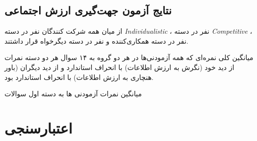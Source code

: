 \subsection{نتایج آزمون جهت‌گیری ارزش اجتماعی}
از میان همه شرکت کنندگان 
\noOfIndividualisticParticipants
نفر در دسته
\textit{
    \gls{Individualistic}
}
،
\noOfCompetitiveParticipants
نفر در دسته
\textit{
    \gls{Competitive}
}
،
\noOfCooperativeParticipants
نفر در دسته
همکاری‌کننده
و
\noOfAltruisticParticipants
نفر در دسته
دیگر‌خواه
قرار داشتند. 

میانگین کلی نمره‌ای که همه آزمودنی‌ها در هر دو گروه به ۱۴ سوال هر دو دسته 
نمرات از دید خود
\!(نگرش به ارزش اطلاعات)
\meanOfSelfWTPAllTwoParticipantGroupsAllTwoQuestionSection
با انحراف استاندارد
\SDOfSelfWTPAllTwoParticipantGroupsAllTwoQuestionSection
و از دید دیگران
\meanOfOtherWTPAllTwoParticipantGroupsAllTwoQuestionSection
\!(باور هنچاری به ارزش اطلاعات)
با انحراف استاندارد
\SDOfOtherWTPAllTwoParticipantGroupsAllTwoQuestionSection
بود.


میانگین نمرات آزمودنی ها به دسته اول سوالات
\section{اعتبارسنجی}

